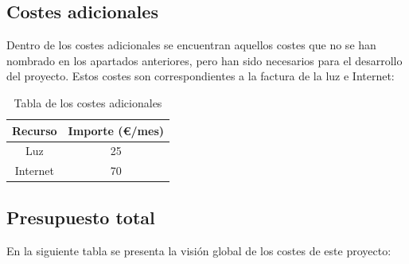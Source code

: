 \subsection{Costes adicionales}
Dentro de los costes adicionales se encuentran aquellos costes que no se han nombrado en los apartados anteriores, pero han sido necesarios para el desarrollo del proyecto. Estos costes son correspondientes a la factura de la luz e Internet:


\begin{table}[H]
\centering
\begin{tabular}{cc}
\hline
\multicolumn{1}{l}{\textbf{Recurso}} & \multicolumn{1}{l}{\textbf{Importe (€/mes)}} \\ \hline
Luz                                  & 25                                           \\
Internet                             & 70                                           \\ \hline
\end{tabular}
\caption{Tabla de los costes adicionales}
\end{table}

\subsection{Presupuesto total}
En la siguiente tabla se presenta la visión global de los costes de este proyecto:

